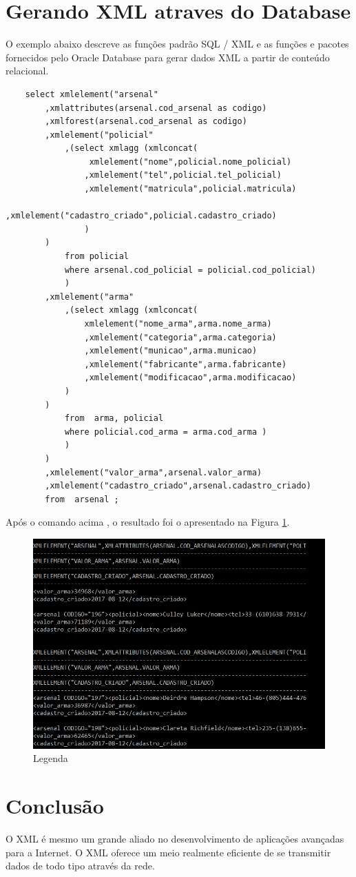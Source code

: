 \documentclass[12pt]{article}
\begin{document}
\section{Gerando XML atraves do Database}
	O exemplo abaixo descreve as funções padrão SQL / XML e as funções e pacotes fornecidos pelo Oracle Database para gerar dados XML a partir de conteúdo relacional. \cite{geracao}
	
	\begin{verbatim}
	select xmlelement("arsenal"
		,xmlattributes(arsenal.cod_arsenal as codigo)
		,xmlforest(arsenal.cod_arsenal as codigo)
		,xmlelement("policial"
			,(select xmlagg (xmlconcat(
				 xmlelement("nome",policial.nome_policial)
				,xmlelement("tel",policial.tel_policial)
				,xmlelement("matricula",policial.matricula)
				,xmlelement("cadastro_criado",policial.cadastro_criado)
				)
		)
			from policial 
			where arsenal.cod_policial = policial.cod_policial)
			)
		,xmlelement("arma"
			,(select xmlagg (xmlconcat(
				xmlelement("nome_arma",arma.nome_arma)
				,xmlelement("categoria",arma.categoria)
				,xmlelement("municao",arma.municao)
				,xmlelement("fabricante",arma.fabricante)
				,xmlelement("modificacao",arma.modificacao)
			)
		)
			from  arma, policial
			where policial.cod_arma = arma.cod_arma )
			)
		)
		,xmlelement("valor_arma",arsenal.valor_arma)
		,xmlelement("cadastro_criado",arsenal.cadastro_criado)     
		from  arsenal ;
	\end{verbatim}
Após o comando acima , o resultado foi o apresentado na Figura \ref{fg2}.
	\begin{figure}[H]
		\centering
		\includegraphics[scale=0.5]{./imagens/f2.png}
		\caption{Legenda}
		\label{fg2}
	\end{figure}
\section{Conclusão}
O XML é mesmo um grande aliado no desenvolvimento de aplicações avançadas para a Internet. O XML oferece um meio realmente eficiente de se transmitir dados de todo tipo através da rede.
	


\end{document}
